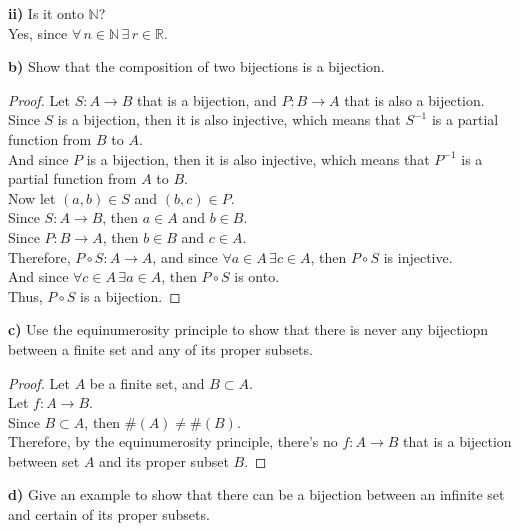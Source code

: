 \documentclass[titlepage, letterpaper, fleqn]{article}
\newcommand{\spacepls}{\vspace{5mm}}
\begin{document}
\spacepls

\textbf{ii)} Is it onto \(\mathbb{N}\)?\\
Yes, since \(\forall \, n \in \mathbb{N} \, \exists \, r \in \mathbb{R}\).

\spacepls

{\large \textbf{b)} Show that the composition of two bijections is a bijection.}

\begin{proof}
Let \(S \colon A \to B\) that is a bijection, and \(P \colon B \to A\) that is also a bijection.\\
Since \(S\) is a bijection, then it is also injective, which means that \(S^{-1}\) is a partial function from \(B\) to \(A\).\\
And since \(P\) is a bijection, then it is also injective, which means that \(P^{-1}\) is a partial function from \(A\) to \(B\).\\
Now let \((a,b) \in S\) and \((b,c) \in P\).\\
Since \(S \colon A \to B\), then \(a \in A\) and \(b \in B\).\\
Since \(P \colon B \to A\), then \(b \in B\) and \(c \in A\).\\
Therefore, \(P \circ S \colon A \to A\), and since \(\forall a \in A \, \exists c \in A\), then \(P \circ S\) is injective.\\
And since \(\forall c \in A \, \exists a \in A\), then \(P \circ S\) is onto.\\
Thus, \(P \circ S\) is a bijection.
\end{proof}

\pagebreak

{\large \textbf{c)} Use the equinumerosity principle to show that there is never any bijectiopn between a finite set and any of its proper subsets.}

\begin{proof}
Let \(A\) be a finite set, and \(B \subset A\).\\
Let \(f \colon A \to B\).\\
Since \(B \subset A\), then \(\#(A) \not = \#(B)\).\\
Therefore, by the equinumerosity principle, there's no \(f \colon A \to B\) that is a bijection between set \(A\) and its proper subset \(B\).
\end{proof}

\spacepls

{\large \textbf{d)} Give an example to show that there can be a bijection between an infinite set and certain of its proper subsets.}
\end{document}
